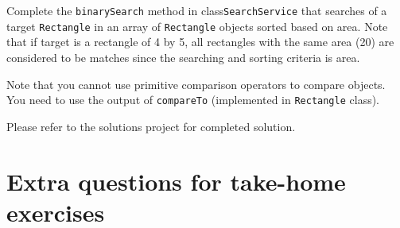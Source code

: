 \begin{questions}
Complete the \texttt{binarySearch} method in class\texttt{SearchService} that searches of a target \texttt{Rectangle} in an array of \texttt{Rectangle} objects sorted based on area. Note that if target is a rectangle of 4 by 5, all rectangles with the same area (20) are considered to be matches since the searching and sorting criteria is area.

Note that you cannot use primitive comparison operators to compare objects. You need to use the output of \texttt{compareTo} (implemented in \texttt{Rectangle} class).

\begin{solution}
Please refer to the solutions project for completed solution.	
\end{solution}

\end{questions}

\newpage

\section*{Extra questions for take-home exercises}

